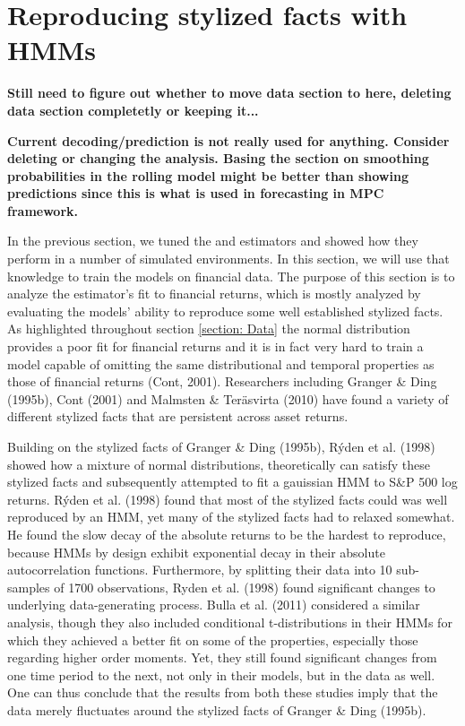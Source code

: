 \newpage

\section{Reproducing stylized facts with HMMs}
\label{Section: Stylized facts}

\textbf{Still need to figure out whether to move data section to here, deleting data section completetly or keeping it...}

\textbf{Current decoding/prediction is not really used for anything. Consider deleting or changing the analysis. Basing the section on smoothing probabilities in the rolling model might be better than showing predictions since this is what is used in forecasting in MPC framework.}

In the previous section, we tuned the \jump and \mle estimators and showed how they perform in a number of simulated environments. In this section, we will use that knowledge to train the models on financial data. The purpose of this section is to analyze the estimator's fit to financial returns, which is mostly analyzed by evaluating the models' ability to reproduce some well established stylized facts. As highlighted throughout section \ref{section: Data} the normal distribution provides a poor fit for financial returns and it is in fact very hard to train a model capable of omitting the same distributional and temporal properties as those of financial returns (Cont, 2001). Researchers including Granger \& Ding (1995b), Cont (2001) and Malmsten \& Teräsvirta (2010) have found a variety of different stylized facts that are persistent across asset returns. 

Building on the stylized facts of Granger \& Ding (1995b), Rýden et al. (1998) showed how a mixture of normal distributions, theoretically can satisfy these stylized facts and subsequently attempted to fit a gauissian HMM to S\&P 500 log returns. Rýden et al. (1998) found that most of the stylized facts could was well reproduced by an HMM, yet many of the stylized facts had to relaxed somewhat. He found the slow decay of the absolute returns to be the hardest to reproduce, because HMMs by design exhibit exponential decay in their absolute autocorrelation functions. Furthermore, by splitting their data into 10 sub-samples of 1700 observations, Ryden et al. (1998) found significant changes to underlying data-generating process. Bulla et al. (2011) considered a similar analysis, though they also included conditional t-distributions in their HMMs for which they achieved a better fit on some of the properties, especially those regarding higher order moments. Yet, they still found significant changes from one time period to the next, not only in their models, but in the data as well. One can thus conclude that the results from both these studies imply that the data merely fluctuates around the stylized facts of Granger \& Ding (1995b).

